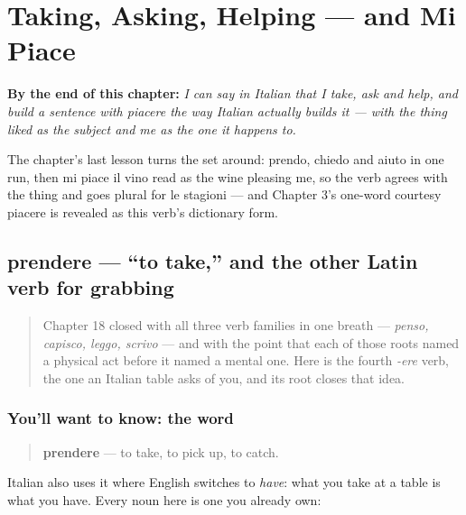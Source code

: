 
\chapter{Taking, Asking, Helping — and Mi Piace}
\label{ch:it-backwards-verb}

\begin{chapteropening}
\textbf{By the end of this chapter:} \emph{I can say in Italian that I take, ask and help, and build a sentence with piacere the way Italian actually builds it — with the thing liked as the subject and me as the one it happens to.}

The chapter's last lesson turns the set around: prendo, chiedo and aiuto in one run, then mi piace il vino read as the wine pleasing me, so the verb agrees with the thing and goes plural for le stagioni — and Chapter 3's one-word courtesy piacere is revealed as this verb's dictionary form.
\end{chapteropening}

\section[prendere]{prendere — \textquotedblleft{}to take,\textquotedblright{} and the other Latin verb for grabbing}

\label{lesson:IT-C19-prendere}



\begin{quote}
Chapter 18 closed with all three verb families in one breath — \emph{penso, capisco, leggo, scrivo} — and with the point that each of those roots named a physical act before it named a mental one. Here is the fourth \emph{-ere} verb, the one an Italian table asks of you, and its root closes that idea.
\end{quote}

\subsection*{You'll want to know: the word}
\begin{quote}
\textbf{prendere} — to take, to pick up, to catch.
\end{quote}

Italian also uses it where English switches to \emph{have}: what you take at a table is what you have. Every noun here is one you already own:

